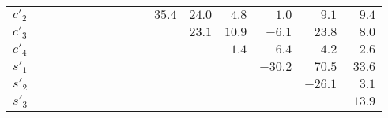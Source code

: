 \documentclass[aps,prd,superscriptaddress,nopreprintnumbers,nofootinbib,showpacs,floatfix]{revtex4}
\begin{document}
\begin{table}[htb]
\begin{center}
\begin{tabular}{lrrrrrrrrrrrrrrr}
$c'_2$&          &          &          &          &          &          &          &          &          &$  35.4 $ %
&$  24.0 $ &$  4.8 $  &$  1.0 $  &$  9.1 $  &$  9.4 $ \\ 
$c'_3$&          &          &          &          &          &          &          &          &          &          %
&$  23.1 $ &$  10.9 $ &$ -6.1 $  &$  23.8 $ &$  8.0 $ \\ 
$c'_4$&          &          &          &          &          &          &          &          &          &          %
&          &$  1.4 $  &$  6.4 $  &$  4.2 $  &$ -2.6 $ \\ 
$s'_1$&          &          &          &          &          &          &          &          &          &          %
&          &          &$ -30.2 $ &$  70.5 $ &$  33.6 $ \\
$s'_2$&          &          &          &          &          &          &          &          &          &          %
&          &          &          &$ -26.1 $ &$  3.1 $ \\ 
$s'_3$&          &          &          &          &          &          &          &          &          &          %
&          &          &          &          &$  13.9 $ \\
\hline\hline
\end{tabular} 
\end{center}
\end{table}
\end{document}
